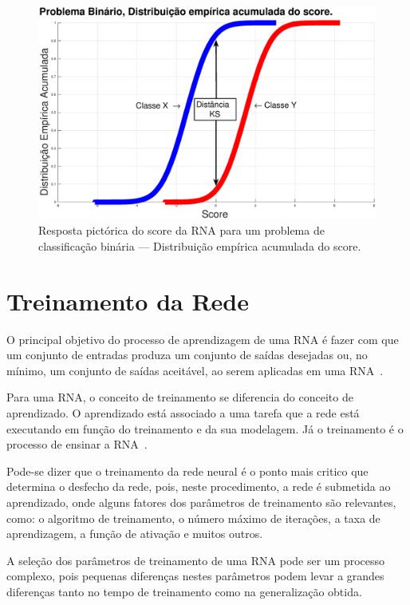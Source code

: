 \begin{figure}[H]
\centering
\includegraphics[width=1\textwidth]{figuras/distribuicao_empirica_acumulada_score.eps}
\caption{Resposta pictórica do score da RNA para um problema de classificação binária --- Distribuição empírica acumulada do score.}
\label{fig:ANN_Distribution_b}
\end{figure}

\section{Treinamento da Rede}
\label{sec:treino-rna}

O principal objetivo do processo de aprendizagem de uma RNA é fazer com que um conjunto de entradas produza um conjunto de saídas desejadas ou, no mínimo, um conjunto de saídas aceitável, ao serem aplicadas em uma RNA~\cite{haykin2007redes}.

Para uma RNA, o conceito de treinamento se diferencia do conceito de aprendizado. O aprendizado está associado a uma tarefa que a rede está executando em função do treinamento e da sua modelagem. Já o treinamento é o processo de ensinar a RNA~\cite{furtado2019redes}.

Pode-se dizer que o treinamento da rede neural é o ponto mais critico que determina o desfecho da rede, pois, neste procedimento, a rede é submetida ao aprendizado, onde alguns fatores dos parâmetros de treinamento são relevantes, como: o algoritmo de treinamento, o número máximo de iterações, a taxa de aprendizagem, a função de ativação e muitos outros.

A seleção dos parâmetros de treinamento de uma RNA pode ser um processo complexo, pois pequenas diferenças nestes parâmetros podem levar a grandes diferenças tanto no tempo de treinamento como na generalização obtida.

